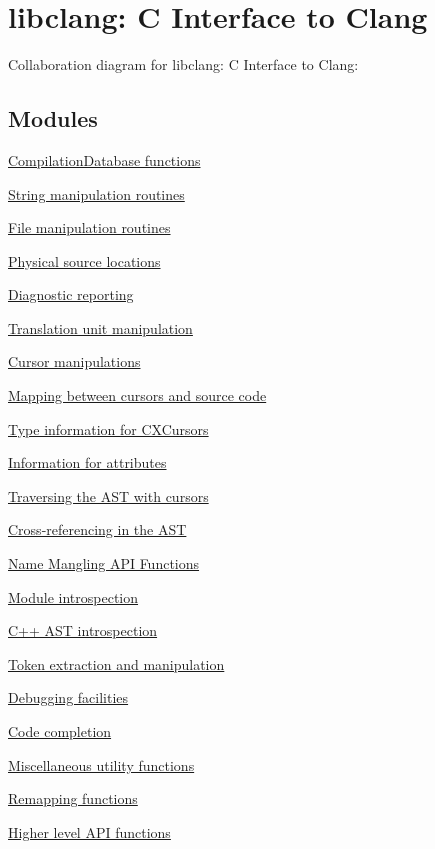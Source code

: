 \hypertarget{group__CINDEX}{}\section{libclang\+: C Interface to Clang}
\label{group__CINDEX}
Collaboration diagram for libclang\+: C Interface to Clang\+:
\subsection*{Modules}
\begin{DoxyCompactItemize}
\item 
\hyperlink{group__COMPILATIONDB}{Compilation\+Database functions}
\item 
\hyperlink{group__CINDEX__STRING}{String manipulation routines}
\item 
\hyperlink{group__CINDEX__FILES}{File manipulation routines}
\item 
\hyperlink{group__CINDEX__LOCATIONS}{Physical source locations}
\item 
\hyperlink{group__CINDEX__DIAG}{Diagnostic reporting}
\item 
\hyperlink{group__CINDEX__TRANSLATION__UNIT}{Translation unit manipulation}
\item 
\hyperlink{group__CINDEX__CURSOR__MANIP}{Cursor manipulations}
\item 
\hyperlink{group__CINDEX__CURSOR__SOURCE}{Mapping between cursors and source code}
\item 
\hyperlink{group__CINDEX__TYPES}{Type information for C\+X\+Cursors}
\item 
\hyperlink{group__CINDEX__ATTRIBUTES}{Information for attributes}
\item 
\hyperlink{group__CINDEX__CURSOR__TRAVERSAL}{Traversing the A\+S\+T with cursors}
\item 
\hyperlink{group__CINDEX__CURSOR__XREF}{Cross-\/referencing in the A\+ST}
\item 
\hyperlink{group__CINDEX__MANGLE}{Name Mangling A\+P\+I Functions}
\item 
\hyperlink{group__CINDEX__MODULE}{Module introspection}
\item 
\hyperlink{group__CINDEX__CPP}{C++ A\+S\+T introspection}
\item 
\hyperlink{group__CINDEX__LEX}{Token extraction and manipulation}
\item 
\hyperlink{group__CINDEX__DEBUG}{Debugging facilities}
\item 
\hyperlink{group__CINDEX__CODE__COMPLET}{Code completion}
\item 
\hyperlink{group__CINDEX__MISC}{Miscellaneous utility functions}
\item 
\hyperlink{group__CINDEX__REMAPPING}{Remapping functions}
\item 
\hyperlink{group__CINDEX__HIGH}{Higher level A\+P\+I functions}
\end{DoxyCompactItemize}
